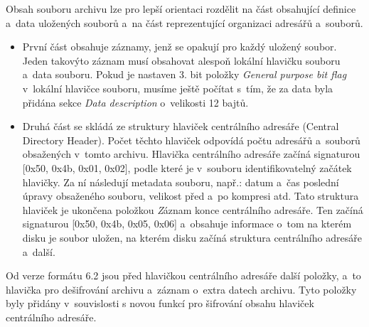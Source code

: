  Obsah souboru archivu lze pro lepší orientaci rozdělit na část obsahující definice a~data
uložených souborů a~na část reprezentující organizaci adresářů a~souborů.
\begin{itemize}
    \item První část obsahuje záznamy, jenž se opakují pro každý uložený soubor. Jeden takovýto
záznam musí obsahovat alespoň lokální hlavičku souboru a~data souboru. Pokud je nastaven
3. bit položky {\it General purpose bit flag} v~lokální hlavičce souboru, musíme ještě počítat
s~tím, že za data byla přidána sekce {\it Data description} o~velikosti 12 bajtů.
    \item Druhá část se skládá ze struktury hlaviček centrálního adresáře (Central Directory
	Header). Počet těchto hlaviček odpovídá počtu adresářů a~souborů obsažených v~tomto
	archivu. Hlavička centrálního adresáře začíná signaturou [0x50, 0x4b, 0x01, 0x02], podle které je
	v~souboru identifikovatelný začátek hlavičky. Za ní následují metadata souboru, např.: datum a~čas
	poslední úpravy obsaženého souboru, velikost před a~po kompresi atd. Tato struktura hlaviček je
	ukončena položkou {\textit Záznam konce centrálního adresáře}. Ten začíná signaturou [0x50, 0x4b, 0x05, 0x06]
	a~obsahuje informace o~tom na kterém disku je soubor uložen, na kterém disku začíná struktura
	centrálního adresáře a~další.
\end{itemize}
Od verze formátu 6.2 jsou před hlavičkou centrálního adresáře další položky, a~to hlavička
pro dešifrování archivu a~záznam o~extra datech archivu. Tyto položky byly přidány
v~souvislosti s novou funkcí pro šifrování obsahu hlaviček centrálního adresáře.

